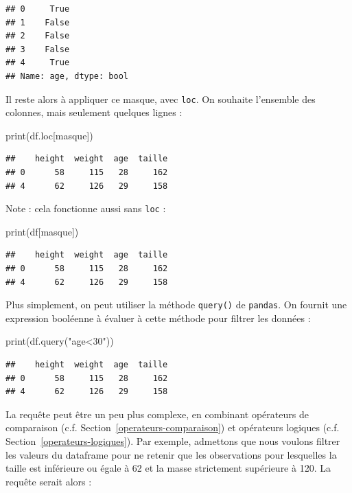 \documentclass[
  12pt,
]{book}
\newenvironment{Shaded}{\begin{snugshade}}{\end{snugshade}}
\newcommand{\BuiltInTok}[1]{#1}
\newcommand{\NormalTok}[1]{#1}
\newcommand{\StringTok}[1]{\textcolor[rgb]{0.31,0.60,0.02}{#1}}
\numberwithin{equation}{section}
\numberwithin{countremarque}{section}
\begin{document}
\begin{lstlisting}
## 0     True
## 1    False
## 2    False
## 3    False
## 4     True
## Name: age, dtype: bool
\end{lstlisting}

Il reste alors à appliquer ce masque, avec \texttt{loc}. On souhaite l'ensemble des colonnes, mais seulement quelques lignes :

\begin{Shaded}
\begin{Highlighting}[]
\BuiltInTok{print}\NormalTok{(df.loc[masque])}
\end{Highlighting}
\end{Shaded}

\begin{lstlisting}
##    height  weight  age  taille
## 0      58     115   28     162
## 4      62     126   29     158
\end{lstlisting}

Note : cela fonctionne aussi sans \texttt{loc} :

\begin{Shaded}
\begin{Highlighting}[]
\BuiltInTok{print}\NormalTok{(df[masque])}
\end{Highlighting}
\end{Shaded}

\begin{lstlisting}
##    height  weight  age  taille
## 0      58     115   28     162
## 4      62     126   29     158
\end{lstlisting}

Plus simplement, on peut utiliser la méthode \texttt{query()} de \texttt{pandas}. On fournit une expression booléenne à évaluer à cette méthode pour filtrer les données :

\begin{Shaded}
\begin{Highlighting}[]
\BuiltInTok{print}\NormalTok{(df.query(}\StringTok{"age\textless{}30"}\NormalTok{))}
\end{Highlighting}
\end{Shaded}

\begin{lstlisting}
##    height  weight  age  taille
## 0      58     115   28     162
## 4      62     126   29     158
\end{lstlisting}

La requête peut être un peu plus complexe, en combinant opérateurs de comparaison (c.f. Section~\ref{operateurs-comparaison}) et opérateurs logiques (c.f. Section~\ref{operateurs-logiques}). Par exemple, admettons que nous voulons filtrer les valeurs du dataframe pour ne retenir que les observations pour lesquelles la taille est inférieure ou égale à 62 et la masse strictement supérieure à 120. La requête serait alors :
\end{document}
